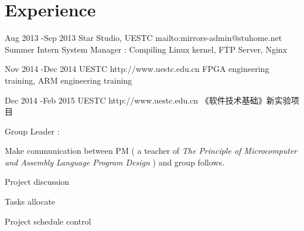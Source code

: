 \documentclass[10pt]{article} %
\begin{document}
%
%
%
%
%
%
%
\section{Experience}
\job
{Aug 2013 -}{Sep 2013}
{Star Studio, UESTC}
{mailto:mirrors-admin@stuhome.net}
{Summer Intern}
{System Manager : Compiling Linux kernel, FTP Server, Nginx}

\job
{Nov 2014 -}{Dec 2014}
{UESTC}
{http://www.uestc.edu.cn}
{FPGA engineering training, ARM engineering training}
{}

\job
{Dec 2014 -}{Feb 2015}
{UESTC}
{http://www.uestc.edu.cn}
{\song 《软件技术基础》新实验项目}
{Group Leader :
\begin{itemize-noindent}
	\item Make communication between PM ( a teacher of \textit {The Principle of Microcomputer and Assembly Language Program Design} ) and group follows.
	\item Project discussion
	\item Tasks allocate
	\item Project schedule control
\end{itemize-noindent}
}
\end{document}
